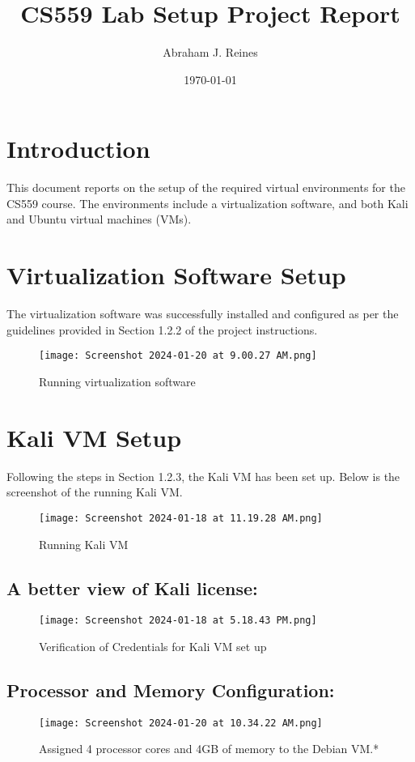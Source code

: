 \documentclass{article}
\title{CS559 Lab Setup Project Report}
\author{Abraham J. Reines}
\date{\today}
\begin{document}
\maketitle

\section{Introduction}
This document reports on the setup of the required virtual environments for the CS559 course. The environments include a virtualization software, and both Kali and Ubuntu virtual machines (VMs).

\section{Virtualization Software Setup}
The virtualization software was successfully installed and configured as per the guidelines provided in Section 1.2.2 of the project instructions.
\begin{figure}[H]
    \centering
    \texttt{[image: Screenshot 2024-01-20 at 9.00.27 AM.png]}
    \caption{Running virtualization software}
\end{figure}

\newpage
\section{Kali VM Setup}
Following the steps in Section 1.2.3, the Kali VM has been set up. Below is the screenshot of the running Kali VM.
\begin{figure}[H]
    \centering
    \texttt{[image: Screenshot 2024-01-18 at 11.19.28 AM.png]}
    \caption{Running Kali VM}
\end{figure}

\subsection{A better view of Kali license:}
\begin{figure}[H]
    \centering
    \texttt{[image: Screenshot 2024-01-18 at 5.18.43 PM.png]}
    \caption{Verification of Credentials for Kali VM set up}
\end{figure}

\subsection{Processor and Memory Configuration:}
\begin{figure}[H]
    \centering
    \texttt{[image: Screenshot 2024-01-20 at 10.34.22 AM.png]}
    \caption{Assigned 4 processor cores and 4GB of memory to the Debian VM.*}
\end{figure}
\end{document}
